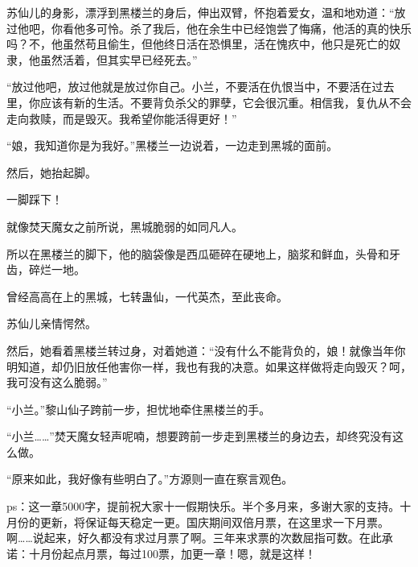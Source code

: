 \begin{this_body}
苏仙儿的身影，漂浮到黑楼兰的身后，伸出双臂，怀抱着爱女，温和地劝道：“放过他吧，你看他多可怜。杀了我后，他在余生中已经饱尝了悔痛，他活的真的快乐吗？不，他虽然苟且偷生，但他终日活在恐惧里，活在愧疚中，他只是死亡的奴隶，他虽然活着，但其实早已经死去。”

“放过他吧，放过他就是放过你自己。小兰，不要活在仇恨当中，不要活在过去里，你应该有新的生活。不要背负杀父的罪孽，它会很沉重。相信我，复仇从不会走向救赎，而是毁灭。我希望你能活得更好！”

“娘，我知道你是为我好。”黑楼兰一边说着，一边走到黑城的面前。

然后，她抬起脚。

一脚踩下！

就像焚天魔女之前所说，黑城脆弱的如同凡人。

所以在黑楼兰的脚下，他的脑袋像是西瓜砸碎在硬地上，脑浆和鲜血，头骨和牙齿，碎烂一地。

曾经高高在上的黑城，七转蛊仙，一代英杰，至此丧命。

苏仙儿亲情愕然。

然后，她看着黑楼兰转过身，对着她道：“没有什么不能背负的，娘！就像当年你明知道，却仍旧放任他害你一样，我也有我的决意。如果这样做将走向毁灭？呵，我可没有这么脆弱。”

“小兰。”黎山仙子跨前一步，担忧地牵住黑楼兰的手。

“小兰……”焚天魔女轻声呢喃，想要跨前一步走到黑楼兰的身边去，却终究没有这么做。

“原来如此，我好像有些明白了。”方源则一直在察言观色。

ps：这一章5000字，提前祝大家十一假期快乐。半个多月来，多谢大家的支持。十月份的更新，将保证每天稳定一更。国庆期间双倍月票，在这里求一下月票。啊……说起来，好久都没有求过月票了啊。三年来求票的次数屈指可数。在此承诺：十月份起点月票，每过100票，加更一章！嗯，就是这样！

\end{this_body}

